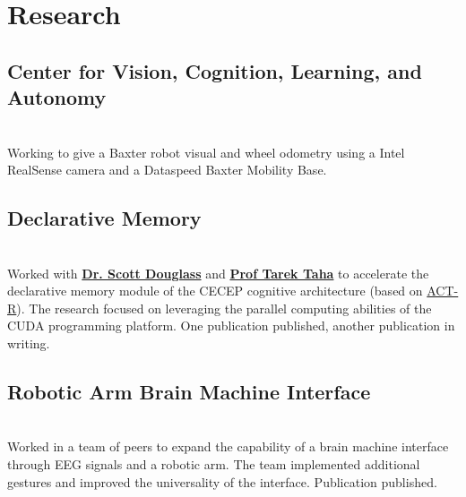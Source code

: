 \documentclass[letterpaper]{deedy-resume} %
\begin{document}
\begin{minipage}[t]{0.66\textwidth} %


\section{Research}

\subsection{Center for Vision, Cognition, Learning, and Autonomy}
 \hfill {} \\ 
\smallsectionspace
Working to give a Baxter robot visual and wheel odometry using a Intel RealSense camera and a Dataspeed Baxter Mobility Base.

\sectionspace %


\subsection{Declarative Memory}
 \hfill {} \\
\smallsectionspace %
Worked with \textbf{\href{http://act-r.psy.cmu.edu/?post_type=authors&p=10523}{Dr. Scott Douglass}} and \textbf{\href{https://www.udayton.edu/directory/engineering/electrical_and_computer/taha_tarek_m.php}{Prof Tarek Taha}} to accelerate the declarative memory module of the CECEP cognitive architecture (based on \href{http://act-r.psy.cmu.edu/}{ACT-R}). The research focused on leveraging the parallel computing abilities of the CUDA programming platform. One publication published, another publication in writing.

\sectionspace %


\subsection{Robotic Arm Brain Machine Interface}
 \hfill {} \\
\smallsectionspace %
Worked in a team of peers to expand the capability of a brain machine interface through EEG signals and a robotic arm. The team implemented additional gestures and improved the universality of the interface. Publication published.



\end{minipage}
\end{document}
